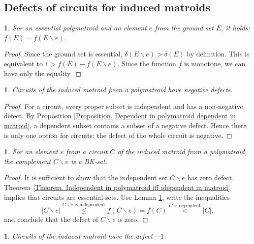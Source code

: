 \documentclass[11pt]{article}
\theoremstyle{plain}
\theoremstyle{definition}
\theoremstyle{remark}
\theoremstyle{plain}
\newtheorem{lem}[thm]{\protect\lemmaname}
\theoremstyle{plain}
\theoremstyle{plain}
\newtheorem{cor}[thm]{\protect\corollaryname}
\theoremstyle{definition}
\providecommand{\corollaryname}{Corollary}
\providecommand{\lemmaname}{Lemma}
\begin{document}
\subsection{Defects of circuits for induced matroids}
\begin{lem}
\label{Lemma. In essential, f(E)=00003Df(E=00005Ca)}For an essential
polymatroid and an element $e$ from the ground set $E$, it holds:
$f(E)=f(E\backslash e).$
\end{lem}

\begin{proof}
Since the ground set is essential, $\delta(E\backslash e)>\delta(E)$
by definition. This is equivalent to $1>f(E)-f(E\backslash e)$. Since
the function $f$ is monotone, we can have only the equality.
\end{proof}
\begin{lem}
\label{Lemma. Circuits have negative defect}Circuits of the induced
matroid from a polymatroid have negative defects.
\end{lem}

\begin{proof}
For a circuit, every proper subset is independent and has a non-negative
defect. By Proposition \ref{Proposition. Dependent in polymatroid dependent in matroid},
a dependent subset contains a subset of a negative defect. Hence there
is only one option for circuits: the defect of the whole circuit is
negative.
\end{proof}
\begin{lem}
\label{Lemma. C=00005Ce is a BK-set}For an element $e$ from a circuit
$C$ of the induced matroid from a polymatroid, the complement $C\backslash e$
is a BK-set.
\end{lem}

\begin{proof}
It is sufficient to show that the independent set $C\backslash e$
has zero defect. Theorem \ref{Theorem. Independent in polymatroid iff idependent in matroid}
implies that circuits are essential sets. Use Lemma \ref{Lemma. In essential, f(E)=00003Df(E=00005Ca)},
write the inequalities
\[
|C\backslash e|\overset{C\backslash e\text{ is independent}}{\leq}f(C\backslash e)=f(C)\overset{C\text{ is dependent}}{<}|C|,
\]
and conclude that the defect of $C\backslash e$ is zero.
\end{proof}
\begin{cor}
\label{Corollary. Defect of circuits is -1}Circuits of the induced
matroid have the defect $-1$.
\end{cor}
\end{document}
